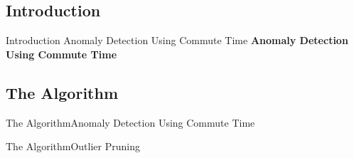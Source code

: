 \subsection{Introduction}
\begin{frame}[label=algorithm-introduction]
        {Introduction}
        {Anomaly Detection Using Commute Time}
    {\LARGE \textbf{Anomaly Detection Using Commute Time}}\\
    \bigskip

\end{frame}

\subsection{The Algorithm}
\begin{frame}[label=algorithm]{The Algorithm}{Anomaly Detection Using Commute Time}\relax
    {\scriptsize
        \begin{algorithm}[H]
            
        \end{algorithm}
    }
\end{frame}

\begin{frame}[label=algorithm]{The Algorithm}{Outlier Pruning}\relax
    {\tiny
        \begin{algorithm}[H]
            
        \end{algorithm}
    }
\end{frame}

